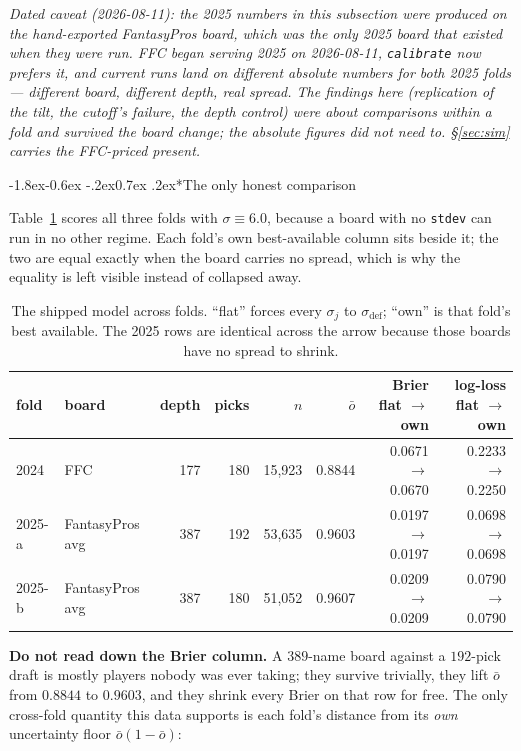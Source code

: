 \documentclass[10pt,a4paper]{article}
\makeatletter
\theoremstyle{plain}
\theoremstyle{definition}
\theoremstyle{remark}
\newcommand{\code}[1]{\texttt{\small #1}}
\renewcommand\subsubsection{\@startsection{subsubsection}{3}{\z@}%
  {-1.8ex\@plus -0.6ex \@minus -.2ex}{0.7ex \@plus .2ex}{\normalfont\normalsize\bfseries}}
\makeatother
\begin{document}
\emph{Dated caveat (2026-08-11): the 2025 numbers in this subsection were produced on the
hand-exported FantasyPros board, which was the only 2025 board that existed when they were
run. FFC began serving 2025 on 2026-08-11, \code{calibrate} now prefers it, and current
runs land on different absolute numbers for both 2025 folds --- different board, different
depth, real spread. The findings here (replication of the tilt, the cutoff's failure, the
depth control) were about \emph{comparisons within a fold} and survived the board change;
the absolute figures did not need to. \S\ref{sec:sim} carries the FFC-priced present.}

\subsubsection*{The only honest comparison}

Table~\ref{tab:crossfold} scores all three folds with $\sigma \equiv 6.0$, because a board
with no \code{stdev} can run in no other regime. Each fold's own best-available column sits
beside it; the two are equal exactly when the board carries no spread, which is why the
equality is left visible instead of collapsed away.

\begin{table}[htbp]
\centering
\small
\begin{tabular}{llrrrrrr}
\toprule
fold & board & depth & picks & $n$ & $\bar o$ & Brier flat $\to$ own & log-loss flat $\to$ own \\
\midrule
2024   & FFC             & 177 & 180 & 15{,}923 & 0.8844 & 0.0671 $\to$ 0.0670 & 0.2233 $\to$ 0.2250 \\
2025-a & FantasyPros avg & 387 & 192 & 53{,}635 & 0.9603 & 0.0197 $\to$ 0.0197 & 0.0698 $\to$ 0.0698 \\
2025-b & FantasyPros avg & 387 & 180 & 51{,}052 & 0.9607 & 0.0209 $\to$ 0.0209 & 0.0790 $\to$ 0.0790 \\
\bottomrule
\end{tabular}
\caption{The shipped model across folds. ``flat'' forces every $\sigma_j$ to
$\sigma_{\text{def}}$; ``own'' is that fold's best available. The 2025 rows are identical
across the arrow because those boards have no spread to shrink.}
\label{tab:crossfold}
\end{table}

\textbf{Do not read down the Brier column.} A $389$-name board against a $192$-pick draft
is mostly players nobody was ever taking; they survive trivially, they lift $\bar o$ from
$0.8844$ to $0.9603$, and they shrink every Brier on that row for free. The only
cross-fold quantity this data supports is each fold's distance from its \emph{own}
uncertainty floor $\bar o(1-\bar o)$:
\end{document}
